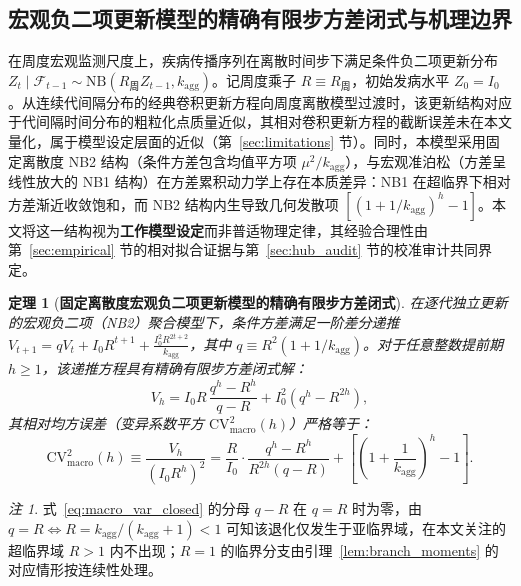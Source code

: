 \documentclass[10pt,UTF8,a4paper,zihao=-4]{ctexart}
\theoremstyle{plain}
\newtheorem{theorem}{定理}
\theoremstyle{remark}
\newtheorem{remark}{注}
\begin{document}
\subsection{宏观负二项更新模型的精确有限步方差闭式与机理边界}\label{sec:macro_model}

在周度宏观监测尺度上，疾病传播序列在离散时间步下满足条件负二项更新分布 $Z_t \mid \mathcal{F}_{t-1} \sim \text{NB}(R_{\text{周}} Z_{t-1}, k_{\text{agg}})$。记周度乘子 $R \equiv R_{\text{周}}$，初始发病水平 $Z_0 = I_0$。从连续代间隔分布的经典卷积更新方程向周度离散模型过渡时，该更新结构对应于代间隔时间分布的粗粒化点质量近似，其相对卷积更新方程的截断误差未在本文量化，属于模型设定层面的近似（第~\ref{sec:limitations} 节）。同时，本模型采用固定离散度 NB2 结构（条件方差包含均值平方项 $\mu^2 / k_{\text{agg}}$），与宏观准泊松（方差呈线性放大的 NB1 结构）在方差累积动力学上存在本质差异：NB1 在超临界下相对方差渐近收敛饱和，而 NB2 结构内生导致几何发散项 $[(1 + 1/k_{\text{agg}})^h - 1]$。本文将这一结构视为\textbf{工作模型设定}而非普适物理定律，其经验合理性由第~\ref{sec:empirical} 节的相对拟合证据与第~\ref{sec:hub_audit} 节的校准审计共同界定。

\begin{theorem}[\textbf{固定离散度宏观负二项更新模型的精确有限步方差闭式}]\label{thm:macro_exact}
在逐代独立更新的宏观负二项（NB2）聚合模型下，条件方差满足一阶差分递推 $V_{t+1} = q V_t + I_0 R^{t+1} + \frac{I_0^2 R^{2t+2}}{k_{\text{agg}}}$，其中 $q \equiv R^2 (1 + 1/k_{\text{agg}})$。对于任意整数提前期 $h \ge 1$，该递推方程具有精确有限步方差闭式解：
\begin{equation}
V_h = I_0 R\, \frac{q^h - R^h}{q - R} + I_0^2 \left(q^h - R^{2h}\right), \label{eq:macro_var_closed}
\end{equation}
其相对均方误差（变异系数平方 $\text{CV}^2_{\text{macro}}(h)$）严格等于：
\begin{equation}
\text{CV}^2_{\text{macro}}(h) \equiv \frac{V_h}{(I_0 R^h)^2} = \frac{R}{I_0}\cdot\frac{q^h - R^h}{R^{2h}(q - R)} + \left[\left(1 + \frac{1}{k_{\text{agg}}}\right)^{\!h} - 1\right]. \label{eq:macro_cv2_closed}
\end{equation}
\end{theorem}

\begin{remark}\label{rem:degenerate}
式~\eqref{eq:macro_var_closed} 的分母 $q - R$ 在 $q = R$ 时为零，由 $q = R \Leftrightarrow R = k_{\text{agg}}/(k_{\text{agg}}+1) < 1$ 可知该退化仅发生于亚临界域，在本文关注的超临界域 $R > 1$ 内不出现；$R = 1$ 的临界分支由引理~\ref{lem:branch_moments} 的对应情形按连续性处理。
\end{remark}
\end{document}
